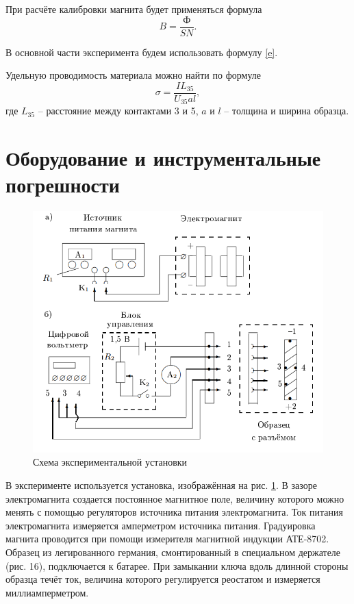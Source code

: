 \documentclass[a4paper]{article}
\begin{document}
При расчёте калибровки магнита будет применяться формула
\begin{equation}\label{eq:calibre}
	B = \frac{Ф}{S N}.
\end{equation}

В основной части эксперимента будем использовать формулу \eqref{e}.

Удельную проводимость материала можно найти по формуле
\begin{equation}\label{key}
	\sigma = \frac{I L_{3 5}}{U_{3 5} a l},
\end{equation}
где $ L_{3 5} $ -- расстояние между контактами 3 и 5, $ a $ и $ l $ -- толщина и ширина образца.
\section{Оборудование и инструментальные погрешности}

\begin{figure}
	\centering
	\includegraphics[width=0.8\linewidth]{схема}
	\caption{Схема экспериментальной установки}
	\label{fig:scheme}
\end{figure}

В эксперименте используется установка, изображённая на рис. \ref{fig:scheme}. В зазоре электромагнита создается постоянное магнитное поле, величину которого можно менять с помощью регуляторов источника питания электромагнита. Ток питания электромагнита измеряется амперметром источника питания. Градуировка магнита проводится при помощи измерителя магнитной индукции АТЕ-8702.
Образец из легированного германия, смонтированный в специальном держателе (рис. 16), подключается к батарее. При замыкании ключа вдоль длинной стороны образца течёт ток, величина которого регулируется реостатом и измеряется миллиамперметром.
\end{document}
